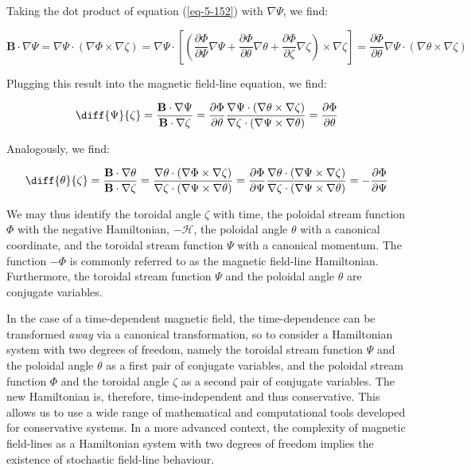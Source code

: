 Taking the dot product of equation (\ref{eq-5-152}) with $\nabla\Psi$, we find:

\begin{equation}
    \mathbf{B}\cdot\nabla\Psi=\nabla\Psi\cdot(\nabla\Phi\times\nabla\zeta)=\nabla\Psi\cdot\left[\left(\frac{\partial\Phi}{\partial\Psi}\nabla\Psi+\frac{\partial\Phi}{\partial\theta}\nabla\theta+\frac{\partial\Phi}{\partial\zeta}\nabla\zeta\right)\times\nabla\zeta\right]=\frac{\partial\Phi}{\partial\theta}\nabla\Psi\cdot(\nabla\theta\times\nabla\zeta)
\end{equation}

Plugging this result into the magnetic field-line equation, we find:

\begin{equation}
    \diff{\Psi}{\zeta}=\frac{\mathbf{B}\cdot\nabla\Psi}{\mathbf{B}\cdot\nabla\zeta}=\frac{\partial\Phi}{\partial\theta}\frac{\nabla\Psi\cdot(\nabla\theta\times\nabla\zeta)}{\nabla\zeta\cdot(\nabla\Psi\times\nabla\theta)}=\frac{\partial\Phi}{\partial\theta}
\end{equation}

Analogously, we find:

\begin{equation}
    \diff{\theta}{\zeta}=\frac{\mathbf{B}\cdot\nabla\theta}{\mathbf{B}\cdot\nabla\zeta}=\frac{\nabla\theta\cdot(\nabla\Phi\times\nabla\zeta)}{\nabla\zeta\cdot(\nabla\Psi\times\nabla\theta)}=\frac{\partial\Phi}{\partial\Psi}\frac{\nabla\theta\cdot(\nabla\Psi\times\nabla\zeta)}{\nabla\zeta\cdot(\nabla\Psi\times\nabla\theta)}=-\frac{\partial\Phi}{\partial\Psi}
\end{equation}

We may thus identify the toroidal angle $\zeta$ with time, the poloidal stream function $\Phi$ with the negative Hamiltonian, $-\mathcal{H}$, the poloidal angle $\theta$ with a canonical coordinate, and the toroidal stream function $\Psi$ with a canonical momentum. The function $-\Phi$ is commonly referred to as the magnetic field-line Hamiltonian. Furthermore, the toroidal stream function $\Psi$ and the poloidal angle $\theta$ are conjugate variables.

\quad In the case of a time-dependent magnetic field, the time-dependence can be transformed \textit{away} via a canonical transformation, so to consider a Hamiltonian system with two degrees of freedom, namely the toroidal stream function $\Psi$ and the poloidal angle $\theta$ as a first pair of conjugate variables, and the poloidal stream function $\Phi$ and the toroidal angle $\zeta$ as a second pair of conjugate variables. The new Hamiltonian is, therefore, time-independent and thus conservative. This allows us to use a wide range of mathematical and computational tools developed for conservative systems. In a more advanced context, the complexity of magnetic field-lines as a Hamiltonian system with two degrees of freedom implies the existence of stochastic field-line behaviour.

